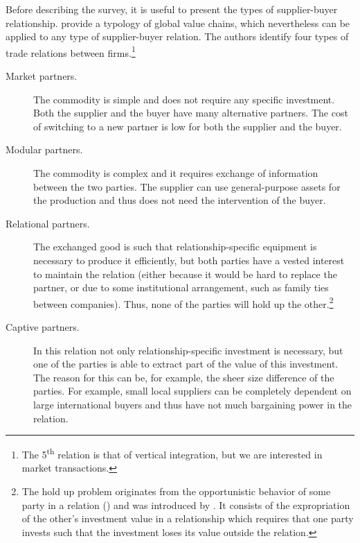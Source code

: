 \documentclass[final, dvipsnames, authoryear,12pt]{elsarticle}
\begin{document}

Before describing the survey, it is useful to present the types of supplier-buyer relationship. \cite{gereffi2005governance} provide a typology of global value chains, which nevertheless can be applied to any type of supplier-buyer relation. The authors identify four types of trade relations between firms.\footnote{The 5\textsuperscript{th} relation is that of vertical integration, but we are interested in market transactions.}

\begin{description}
    \item[Market partners.] The commodity is simple and does not require any specific investment. Both the supplier and the buyer have many alternative partners. The cost of switching to a new partner is low for both the supplier and the buyer.
    \item[Modular partners.] The commodity is complex and it requires exchange of information between the two parties. The supplier can use general-purpose assets for the production and thus does not need the intervention of the buyer.
    \item[Relational partners.] The exchanged good is such that relationship-specific equipment is necessary to produce it efficiently, but both parties have a vested interest to maintain the relation (either because it would be hard to replace the partner, or due to some institutional arrangement, such as family ties between companies). Thus, none of the parties will hold up the other.\footnote{The hold up problem originates from the opportunistic behavior of some party in a relation (\cite{williamson2007economic}) and was introduced by \cite{grossman1986costs}. It consists of the expropriation of the other's investment value in a relationship which requires that one party invests such that the investment loses its value outside the relation.}
    \item[Captive partners.] In this relation not only relationship-specific investment is necessary, but one of the parties is able to extract part of the value of this investment. The reason for this can be, for example, the sheer size difference of the parties. For example, small local suppliers can be completely dependent on large international buyers and thus have not much bargaining power in the relation.
\end{description}
\end{document}
